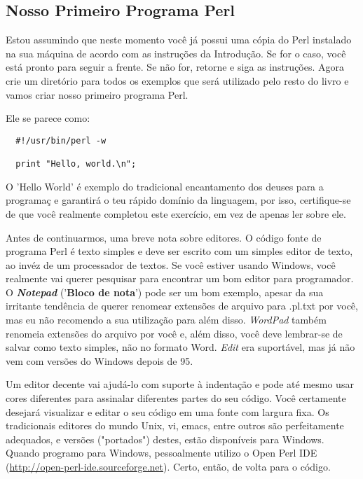 \documentclass[a4paper,12pt,twoside]{book}
\begin{document}
\subsection{Nosso Primeiro Programa Perl}

\noindent Estou assumindo que neste momento você já possui uma cópia do Perl 
instalado na sua máquina de acordo com as instru\c{c}ões da Introdu\c{c}ão. 
Se for o caso, você está pronto para seguir a frente. Se não for, retorne e 
siga as instru\c{c}ões. Agora crie um diretório para todos os exemplos que 
será utilizado pelo resto do livro e vamos criar nosso primeiro programa Perl.\medskip

\noindent Ele se parece como:

\begin{lstlisting}
  #!/usr/bin/perl -w

  print "Hello, world.\n";
\end{lstlisting}

\noindent O 'Hello World' é exemplo do tradicional encantamento dos deuses para a 
programa\c{c} e garantirá o teu rápido domínio da linguagem, por isso, 
certifique-se de que você realmente completou este exercício, em vez de 
apenas ler sobre ele.\medskip

\noindent Antes de continuarmos, uma breve nota sobre editores. O código 
fonte de programa Perl é texto simples e deve ser escrito com um simples 
editor de texto, ao invéz de um processador de textos. Se você estiver usando 
Windows, você realmente vai querer pesquisar para encontrar um bom editor para 
programador. O \textit{\textbf{Notepad}} ('\textbf{Bloco de nota}') pode ser 
um bom exemplo, apesar da sua irritante tendência de querer renomear extensões 
de arquivo para .pl.txt por você, mas eu não recomendo a sua utilização para 
além disso. \textit{WordPad} também renomeia extensões do arquivo por você e, 
além disso, você deve lembrar-se de salvar como texto simples, não no formato Word. 
\textit{Edit} era suportável, mas já não vem com versões do Windows depois de 95.\medskip

\noindent Um editor decente vai ajudá-lo com suporte à indentação e pode até 
mesmo usar cores diferentes para assinalar diferentes partes do seu código. 
Você certamente desejará visualizar e editar o seu código em uma fonte com 
largura fixa. Os tradicionais editores do mundo Unix, vi, emacs, entre outros 
são perfeitamente adequados, e versões ("portados") destes, estão disponíveis 
para Windows. Quando programo para Windows, pessoalmente utilizo o Open Perl 
IDE (\url{http://open-perl-ide.sourceforge.net}). Certo, então, de volta para o código.\medskip
\end{document}
